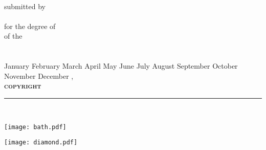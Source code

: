 \documentclass[
11pt, %
chapterinoneline,%
english, %
singlespacing, %
headsepline, %
]{MastersDoctoralThesis} %
\author{Andrew R. McCluskey} %
\newcommand{\MONTH}{%
	\ifcase\the\month
	\or January%
	\or February%
	\or March%
	\or April%
	\or May%
	\or June%
	\or July%
	\or August%
	\or September%
	\or October%
	\or November%
	\or December%
	\fi}
\begin{document}
\frontmatter %

\pagestyle{plain} %


\begin{titlepage}
\begin{center}
\doublespacing

{\huge \bfseries \ttitle}\\
\vspace{0.4cm} %
submitted by \\
\vspace{0.1cm}
\text{\huge \authorname} \\
\vspace{0.2cm}
for the degree of \degreename \\
\vspace{0.1cm}
of the \\
\vspace{0.2cm}
{\scshape\LARGE \univname} \\
\vspace{0.1cm}
\deptname \\
\vspace{0.5cm}
\MONTH, \the\year \\
\vspace{8.cm}
{\scshape \bfseries copyright} \\
\doclicenseThis
\vspace{1.5cm}
\rule[0.5em]{25em}{0.5pt} \\
\vspace{1.cm}

\begin{minipage}[t][][b]{0.4\textwidth}
\begin{flushleft}
\texttt{[image: bath.pdf]}
\end{flushleft}
\end{minipage}
\begin{minipage}[t][][b]{0.4\textwidth}
\begin{flushright}
\texttt{[image: diamond.pdf]}
\end{flushright}
\end{minipage}\\[2cm]


\vfill
\end{center}
\end{titlepage}
\end{document}
